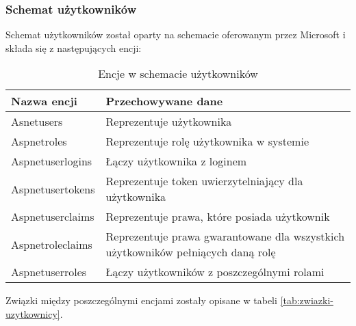 \subsubsection{Schemat użytkowników}

Schemat użytkowników został oparty na schemacie oferowanym przez Microsoft 
\parencite{vickers2021} i składa się z następujących encji:

    \begin{xltabular}{1\textwidth} { 
        | >{\raggedright\arraybackslash}X        
        | >{\raggedright\arraybackslash}X | }
        \caption{Encje w schemacie użytkowników} \label{tab:encje-uzytkownicy}\\
        \hline
       Nazwa encji & Przechowywane dane \\
       \hline
       Asnetusers & Reprezentuje użytkownika \\
       \hline
       Aspnetroles & Reprezentuje rolę użytkownika w systemie \\
       \hline
       Aspnetuserlogins & Łączy użytkownika z loginem \\
       \hline
       Aspnetusertokens & Reprezentuje token uwierzytelniający dla użytkownika \\
       \hline
       Aspnetuserclaims & Reprezentuje prawa, które posiada użytkownik \\
       \hline
       Aspnetroleclaims & Reprezentuje prawa gwarantowane dla wszystkich użytkowników
       pełniących daną rolę \\
       \hline
       Aspnetuserroles & Łączy użytkowników z poszczególnymi rolami \\
       \hline
    \end{xltabular}

Związki między poszczególnymi encjami zostały opisane w tabeli \ref{tab:zwiazki-uzytkownicy}.

